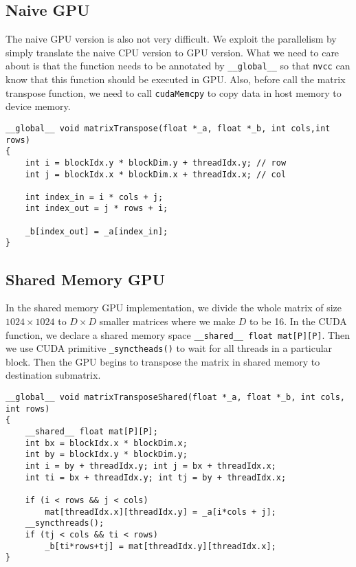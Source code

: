 \documentclass{article}
\begin{document}
\subsection{Naive GPU}
The naive GPU version is also not very difficult. We exploit the parallelism by simply translate the naive CPU version to GPU version. What we need to care about is that the function needs to be annotated by \verb|__global__| so that \verb|nvcc| can know that this function should be executed in GPU. Also, before call the matrix transpose function, we need to call \verb|cudaMemcpy| to copy data in host memory to device memory.
\begin{lstlisting}[caption=Naive GPU]
__global__ void matrixTranspose(float *_a, float *_b, int cols,int rows)
{
	int i = blockIdx.y * blockDim.y + threadIdx.y; // row
	int j = blockIdx.x * blockDim.x + threadIdx.x; // col
	
	int index_in = i * cols + j;
	int index_out = j * rows + i;
	
	_b[index_out] = _a[index_in];
}
\end{lstlisting}

\subsection{Shared Memory GPU}
In the shared memory GPU implementation, we divide the whole matrix of size $1024\times 1024$ to $D\times D$ smaller matrices where we make $D$ to be 16. In the CUDA function, we declare a shared memory space \verb|__shared__ float mat[P][P]|. Then we use CUDA primitive \verb|_synctheads()| to wait for all threads in a particular block. Then the GPU begins to transpose the matrix in shared memory to destination submatrix.
\begin{lstlisting}[caption=Shared Memory GPU]
__global__ void matrixTransposeShared(float *_a, float *_b, int cols, int rows)
{
	__shared__ float mat[P][P];
	int bx = blockIdx.x * blockDim.x;
	int by = blockIdx.y * blockDim.y;
	int i = by + threadIdx.y; int j = bx + threadIdx.x;
	int ti = bx + threadIdx.y; int tj = by + threadIdx.x;
	
	if (i < rows && j < cols)
		mat[threadIdx.x][threadIdx.y] = _a[i*cols + j];
	__syncthreads();
	if (tj < cols && ti < rows)
		_b[ti*rows+tj] = mat[threadIdx.y][threadIdx.x];
}
\end{lstlisting} 
\end{document}
